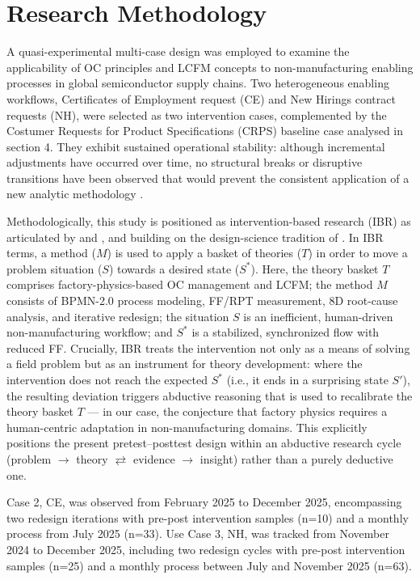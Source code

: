 \documentclass[preprint,12pt,authoryear]{elsarticle}
\begin{document}
\section{Research Methodology}\label{sec:Research Methodology}

A quasi-experimental multi-case design \citep{Shadish2002} was employed to examine the applicability of OC principles and LCFM concepts to non-manufacturing enabling processes in global semiconductor supply chains. Two heterogeneous enabling workflows, Certificates of Employment request (CE) and New Hirings contract requests (NH), were selected as two intervention cases, complemented by the Costumer Requests for Product Specifications (CRPS) baseline case analysed in section 4. They exhibit sustained operational stability: although incremental adjustments have occurred over time, no structural breaks or disruptive transitions have been observed that would prevent the consistent application of a new analytic methodology \citep{rossini2019industry}.

Methodologically, this study is positioned as intervention-based research (IBR) as articulated by \citet{oliva2019intervention} and \citet{chandrasekaran2020ibr}, and building on the design-science tradition of \citet{vanaken2016design}. In IBR terms, a method ($M$) is used to apply a basket of theories ($T$) in order to move a problem situation ($S$) towards a desired state ($S^{*}$). Here, the theory basket $T$ comprises factory-physics-based OC management and LCFM; the method $M$ consists of BPMN-2.0 process modeling, FF/RPT measurement, 8D root-cause analysis, and iterative redesign; the situation $S$ is an inefficient, human-driven non-manufacturing workflow; and $S^{*}$ is a stabilized, synchronized flow with reduced FF\@. Crucially, IBR treats the intervention not only as a means of solving a field problem but as an instrument for theory development: where the intervention does not reach the expected $S^{*}$ (i.e., it ends in a surprising state $S'$), the resulting deviation triggers abductive reasoning that is used to recalibrate the theory basket $T$ --- in our case, the conjecture that factory physics requires a human-centric adaptation in non-manufacturing domains. This explicitly positions the present pretest--posttest design within an abductive research cycle (problem $\rightarrow$ theory $\rightleftarrows$ evidence $\rightarrow$ insight) rather than a purely deductive one.

Case 2, CE, was observed from February 2025 to December 2025, encompassing two redesign iterations with pre-post intervention samples (n=10) and a monthly process from July 2025 (n=33)\@. Use Case 3, NH, was tracked from November 2024 to December 2025, including two redesign cycles with pre-post intervention samples (n=25) and a monthly process between July and November 2025 (n=63). 
\end{document}
